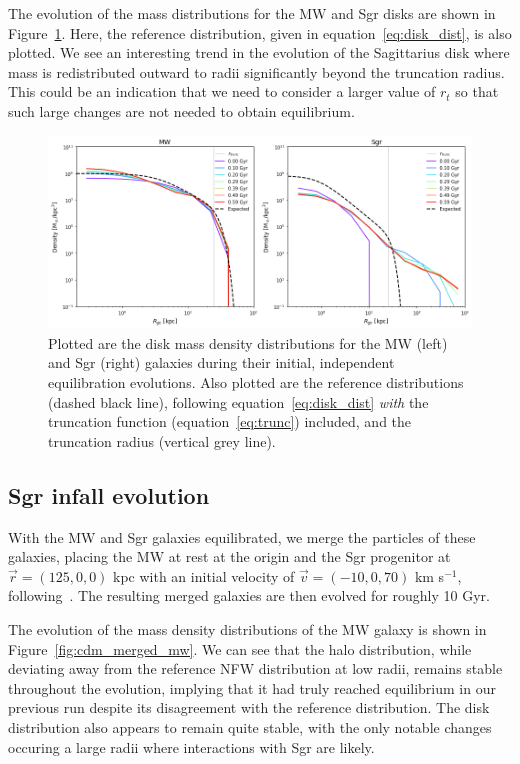 The evolution of the mass distributions for the MW and Sgr disks are shown in
Figure~\ref{fig:cdm_init_disk}. Here, the reference distribution, given in
equation~\ref{eq:disk_dist}, is also plotted. We see an interesting trend in the
evolution of the Sagittarius disk where mass is redistributed outward to radii
significantly beyond the truncation radius. This could be an indication that we
need to consider a larger value of $r_t$ so that such large changes are not
needed to obtain equilibrium.

\begin{figure}[t]
    \centering
    \includegraphics[width=0.9\linewidth]{fig/cdm/init_disk.png}
    \caption{
        Plotted are the disk mass density distributions for the MW (left) and
        Sgr (right) galaxies during their initial, independent equilibration
        evolutions. Also plotted are the reference distributions (dashed black
        line), following equation~\ref{eq:disk_dist} \textit{with} the
        truncation function (equation~\ref{eq:trunc}) included, and the
        truncation radius (vertical grey line).
    }
    \label{fig:cdm_init_disk}
\end{figure}

\subsection{Sgr infall evolution}
With the MW and Sgr galaxies equilibrated, we merge the particles of these
galaxies, placing the MW at rest at the origin and the Sgr progenitor at
$\vec{r} = (125, 0, 0)$ kpc with an initial velocity of $\vec{v} = (-10, 0, 70)$
km s$^{-1}$, following~\cite{dierickx_predicted_2017}. The resulting merged
galaxies are then evolved for roughly 10 Gyr. 

The evolution of the mass density distributions of the MW galaxy is shown in
Figure~\ref{fig:cdm_merged_mw}. We can see that the halo distribution, while
deviating away from the reference NFW distribution at low radii, remains stable
throughout the evolution, implying that it had truly reached equilibrium in our
previous run despite its disagreement with the reference distribution. The disk
distribution also appears to remain quite stable, with the only notable changes
occuring a large radii where interactions with Sgr are likely.

